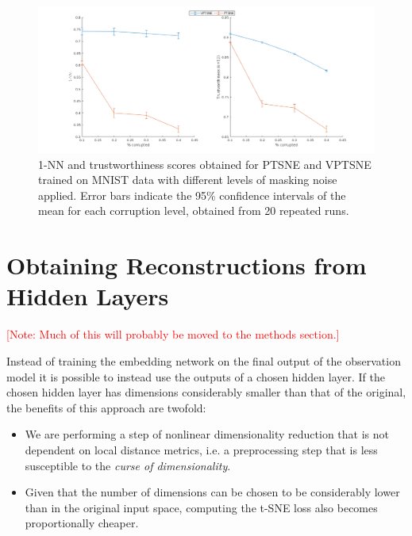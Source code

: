 \begin{figure}[!htb]
  \centering
  \includegraphics[width=\textwidth]{images/corrupted.png}
  \caption{ 1-NN and trustworthiness scores obtained for PTSNE and VPTSNE trained on MNIST data with different levels of masking noise applied. Error bars indicate the 95\% confidence intervals of the mean for each corruption level, obtained from 20 repeated runs.}
  \label{fig:corrupted_data}
\end{figure}

\section{Obtaining Reconstructions from Hidden Layers}

\textcolor{red}{[Note: Much of this will probably be moved to the methods section.]}

Instead of training the embedding network on the final output of the observation model it is possible to instead use the outputs of a chosen hidden layer. If the chosen hidden layer has dimensions considerably smaller than that of the original, the benefits of this approach are twofold:

\begin{itemize}
\item We are performing a step of nonlinear dimensionality reduction that is not dependent on local distance metrics, i.e. a preprocessing step that is less susceptible to the \textit{curse of dimensionality}.
\item Given that the number of dimensions can be chosen to be considerably lower than in the original input space, computing the t-SNE loss also becomes proportionally cheaper.
\end{itemize}

